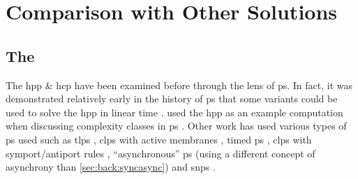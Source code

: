 \section{Comparison with Other  Solutions}


\subsection{The }


The \gls{hpp} \& \gls{hcp} have been examined before through the lens of \gls{ps}.  In fact, it was demonstrated relatively early in the history of \gls{ps} that some variants could be used to solve the \gls{hpp} in linear time \cite{Mutyam2001}.  \citeauthor{Jimenez2003} used the \gls{hpp} as an example computation when discussing complexity classes in \gls{ps} \cite{Jimenez2003}.  %
Other work has used various types of \gls{ps} used such as \gls{tlps} \cite{Martin-Vide2003}, \gls{clps} with active membranes \cite{Pan2006,Chen2009}, timed \gls{ps} \cite{Song2013}, \gls{clps} with symport/antiport rules \cite{Orellana-Martin2019a}, ``asynchronous'' \gls{ps} \cite{Tagawa2012} (using a different concept of asynchrony than \cref{sec:back:syncasync}) and \gls{snps} \cite{Xue2013}.

